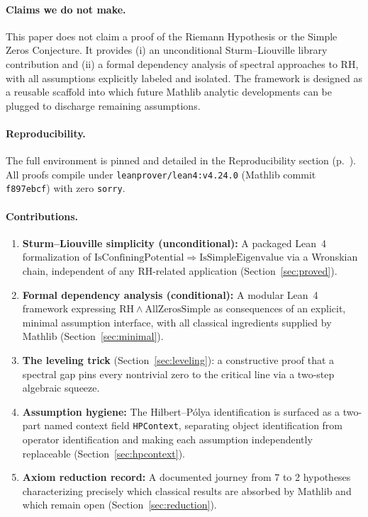 \documentclass[12pt, a4paper]{article}
\theoremstyle{plain}
\theoremstyle{definition}
\newcommand{\lean}[1]{\texttt{#1}}
\newcommand{\Mathlib}{\textsf{Mathlib}}
\newcommand{\Lean}{\textsf{Lean~4}}
\newcommand{\RH}{\mathrm{RH}}
\begin{document}
\paragraph{Claims we do not make.}
This paper does not claim a proof of the Riemann Hypothesis or the Simple Zeros
Conjecture.
It provides (i) an unconditional Sturm--Liouville library contribution and (ii)
a formal dependency analysis of spectral approaches to RH, with all assumptions
explicitly labeled and isolated.
The framework is designed as a reusable scaffold into which future Mathlib
analytic developments can be plugged to discharge remaining assumptions.

\paragraph{Reproducibility.}
The full environment is pinned and detailed in the Reproducibility
section (p.~\pageref{sec:reproducibility}).
All proofs compile under \texttt{leanprover/lean4:v4.24.0}
(Mathlib commit \texttt{f897ebcf}) with zero \lean{sorry}.

\paragraph{Contributions.}
\begin{enumerate}[label=\textbf{C\arabic*.}]
  \item \textbf{Sturm--Liouville simplicity (unconditional):}
        A packaged \Lean{} formalization of $\mathrm{IsConfiningPotential}
        \Rightarrow \mathrm{IsSimpleEigenvalue}$ via a Wronskian chain,
        independent of any RH-related application (Section~\ref{sec:proved}).
  \item \textbf{Formal dependency analysis (conditional):}
        A modular \Lean{} framework expressing $\RH \wedge \text{AllZerosSimple}$
        as consequences of an explicit, minimal assumption interface, with all
        classical ingredients supplied by \Mathlib{} (Section~\ref{sec:minimal}).
  \item \textbf{The leveling trick} (Section~\ref{sec:leveling}):
        a constructive proof that a spectral gap pins every nontrivial zero
        to the critical line via a two-step algebraic squeeze.
  \item \textbf{Assumption hygiene:}
        The Hilbert--P\'{o}lya identification is surfaced as a two-part named
        context field \lean{HPContext}, separating object identification from
        operator identification and making each assumption independently replaceable
        (Section~\ref{sec:hpcontext}).
  \item \textbf{Axiom reduction record:}
        A documented journey from 7 to 2 hypotheses characterizing precisely
        which classical results are absorbed by \Mathlib{} and which remain open
        (Section~\ref{sec:reduction}).
\end{enumerate}
\end{document}
